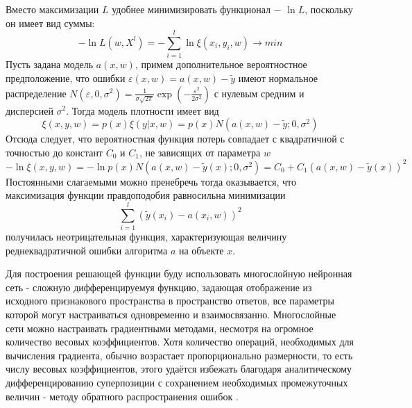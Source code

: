 Вместо максимизации \(L\) удобнее минимизировать функционал − \(\ln{L}\), поскольку
он имеет вид суммы:
\begin{equation}
-\ln{L(w, X^l) = - \sum_{i=1}^l \ln{\xi(x_i,y_i,w)} \to min}
\end{equation}
Пусть задана модель \(a(x, w)\), примем дополнительное вероятностное предположение,
что ошибки \( \varepsilon(x, w) = a(x, w) - \tilde{y}\) имеют нормальное распределение 
\(N(\varepsilon, 0, \sigma^2) = \frac{1}{\sigma \sqrt{2\pi}}\exp(-\frac{\varepsilon^2}{2\sigma^2})\) с нулевым средним и дисперсией \(\sigma^2\). Тогда модель плотности имеет вид
\begin{equation}
\xi(x,y,w) = p(x)\xi(y|x,w) = p(x)N(a(x, w) - \tilde{y};0,\sigma^2)
\end{equation}
Отсюда следует, что вероятностная функция потерь совпадает с квадратичной с точностью до констант \(C_0\) и \(C_1\), не зависящих от параметра \(w\)
\begin{equation}
-\ln{\xi(x,y,w)} = - \ln{p(x)N(a(x,w) - \tilde{y}(x);0,\sigma^2)} = C_0 + C_1(a(x,w) - \tilde{y}(x))^2
\end{equation}
Постоянными слагаемыми можно пренебречь тогда оказывается, что максимизация функции правдоподобия равносильна минимизации
\begin{equation}
\sum_{i=1}^l(\tilde{y}(x_i) - a(x_i, w))^2
\end{equation}
получилась неотрицательная функция, характеризующая величину реднеквадратичной ошибки алгоритма \(a\) на объекте \(x\).

Для построения решающей функции буду использовать многослойную нейронная сеть -  сложную дифференцируемуя функцию, задающая отображение из исходного признакового пространства в пространство ответов, все параметры которой могут настраиваться одновременно и взаимосвязанно. Многослойные сети можно настраивать градиентными методами, несмотря на огромное количество весовых коэффициентов. Хотя количество операций, необходимых для вычисления градиента, обычно возрастает пропорционально размерности, то есть числу весовых коэффициентов, этого удаётся избежать благодаря аналитическому дифференцированию суперпозиции с сохранением необходимых промежуточных величин - методу обратного распространения ошибок \cite{lecun1988theoretical}.

